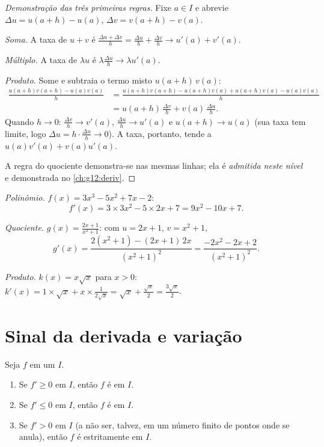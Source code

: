 \begin{proof}[Demonstração das três primeiras regras]
Fixe $a \in I$ e abrevie $\Delta u = u(a+h) - u(a)$,
$\Delta v = v(a+h) - v(a)$.

\emph{Soma.} A taxa de $u + v$ é
$\frac{\Delta u + \Delta v}{h} = \frac{\Delta u}{h} + \frac{\Delta v}{h}
\to u'(a) + v'(a)$.

\emph{Múltiplo.} A taxa de $\lambda u$ é
$\lambda \frac{\Delta u}{h} \to \lambda u'(a)$.

\emph{Produto.} Some e subtraia o termo misto $u(a+h)\,v(a)$:
\begin{align*}
\frac{u(a+h)v(a+h) - u(a)v(a)}{h}
&= \frac{u(a+h)v(a+h) - u(a+h)v(a) + u(a+h)v(a) - u(a)v(a)}{h}\\
&= u(a+h)\,\frac{\Delta v}{h} + v(a)\,\frac{\Delta u}{h}.
\end{align*}
Quando $h \to 0$: $\frac{\Delta v}{h} \to v'(a)$,
$\frac{\Delta u}{h} \to u'(a)$ e $u(a+h) \to u(a)$ (sua taxa tem limite,
logo $\Delta u = h \cdot \frac{\Delta u}{h} \to 0$). A taxa, portanto,
tende a $u(a)v'(a) + v(a)u'(a)$.

A regra do quociente demonstra-se nas mesmas linhas; ela é
\emph{admitida neste nível} e demonstrada no \cref{ch:g12:deriv}.
\end{proof}

\begin{example}\label{ex:g11:deriv:computations}
\emph{Polinômio.} $f(x) = 3x^3 - 5x^2 + 7x - 2$:
\[
f'(x) = 3 \times 3x^2 - 5 \times 2x + 7 = 9x^2 - 10x + 7 .
\]

\emph{Quociente.} $g(x) = \frac{2x+1}{x^2+1}$: com $u = 2x + 1$,
$v = x^2 + 1$,
\[
g'(x) = \frac{2(x^2+1) - (2x+1)\,2x}{(x^2+1)^2}
= \frac{-2x^2 - 2x + 2}{(x^2+1)^2}.
\]

\emph{Produto.} $k(x) = x\sqrt x$ para $x > 0$:
$k'(x) = 1 \times \sqrt x + x \times \frac{1}{2\sqrt x}
= \sqrt x + \frac{\sqrt x}{2} = \frac{3\sqrt x}{2}$.
\end{example}

\section{Sinal da derivada e variação}

\begin{theorem}\label{thm:g11:deriv:variations}
Seja $f$  em um  $I$.
\begin{enumerate}
  \item Se $f' \geq 0$ em $I$, então $f$ é  em $I$.
  \item Se $f' \leq 0$ em $I$, então $f$ é  em $I$.
  \item Se $f' > 0$ em $I$ (a não ser, talvez, em um número finito de
        pontos onde se anula), então $f$ é estritamente  em $I$.
\end{enumerate}
\end{theorem}


